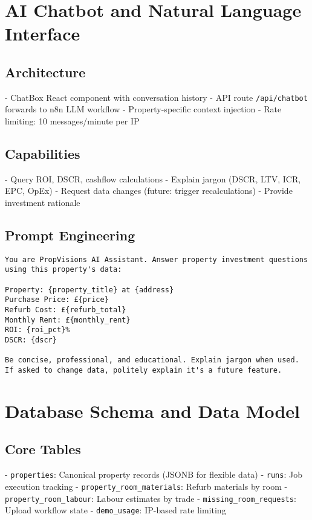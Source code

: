 \documentclass[11pt,a4paper]{article}
\begin{document}
\section{AI Chatbot and Natural Language Interface}

\subsection{Architecture}
- ChatBox React component with conversation history
- API route \texttt{/api/chatbot} forwards to n8n LLM workflow
- Property-specific context injection
- Rate limiting: 10 messages/minute per IP

\subsection{Capabilities}
- Query ROI, DSCR, cashflow calculations
- Explain jargon (DSCR, LTV, ICR, EPC, OpEx)
- Request data changes (future: trigger recalculations)
- Provide investment rationale

\subsection{Prompt Engineering}
\begin{lstlisting}[caption=Chatbot System Prompt]
You are PropVisions AI Assistant. Answer property investment questions
using this property's data:

Property: {property_title} at {address}
Purchase Price: £{price}
Refurb Cost: £{refurb_total}
Monthly Rent: £{monthly_rent}
ROI: {roi_pct}%
DSCR: {dscr}

Be concise, professional, and educational. Explain jargon when used.
If asked to change data, politely explain it's a future feature.
\end{lstlisting}

\section{Database Schema and Data Model}

\subsection{Core Tables}
- \texttt{properties}: Canonical property records (JSONB for flexible data)
- \texttt{runs}: Job execution tracking
- \texttt{property\_room\_materials}: Refurb materials by room
- \texttt{property\_room\_labour}: Labour estimates by trade
- \texttt{missing\_room\_requests}: Upload workflow state
- \texttt{demo\_usage}: IP-based rate limiting
\end{document}
